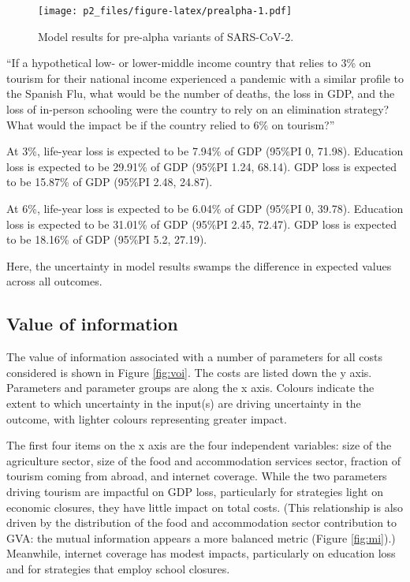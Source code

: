 \documentclass[
]{article}
\begin{document}
\begin{figure}
\centering
\texttt{[image: p2\_files/figure-latex/prealpha-1.pdf]}
\caption{\label{fig:prealpha}Model results for pre-alpha variants of SARS-CoV-2.}
\end{figure}

``If a hypothetical low- or lower-middle income country that relies to 3\% on tourism for their national income experienced a pandemic with a similar profile to the Spanish Flu, what would be the number of deaths, the loss in GDP, and the loss of in-person schooling were the country to rely on an elimination strategy? What would the impact be if the country relied to 6\% on tourism?''

At 3\%, life-year loss is expected to be 7.94\% of GDP (95\%PI 0, 71.98). Education loss is expected to be 29.91\% of GDP (95\%PI 1.24, 68.14). GDP loss is expected to be 15.87\% of GDP (95\%PI 2.48, 24.87).

At 6\%, life-year loss is expected to be 6.04\% of GDP (95\%PI 0, 39.78). Education loss is expected to be 31.01\% of GDP (95\%PI 2.45, 72.47). GDP loss is expected to be 18.16\% of GDP (95\%PI 5.2, 27.19).

Here, the uncertainty in model results swamps the difference in expected values across all outcomes.

\newpage

\hypertarget{value-of-information-1}{%
\subsection{Value of information}\label{value-of-information-1}}

The value of information associated with a number of parameters for all costs considered is shown in Figure \ref{fig:voi}. The costs are listed down the y axis. Parameters and parameter groups are along the x axis. Colours indicate the extent to which uncertainty in the input(s) are driving uncertainty in the outcome, with lighter colours representing greater impact.

The first four items on the x axis are the four independent variables: size of the agriculture sector, size of the food and accommodation services sector, fraction of tourism coming from abroad, and internet coverage. While the two parameters driving tourism are impactful on GDP loss, particularly for strategies light on economic closures, they have little impact on total costs. (This relationship is also driven by the distribution of the food and accommodation sector contribution to GVA: the mutual information appears a more balanced metric (Figure \ref{fig:mi}).) Meanwhile, internet coverage has modest impacts, particularly on education loss and for strategies that employ school closures.
\end{document}
